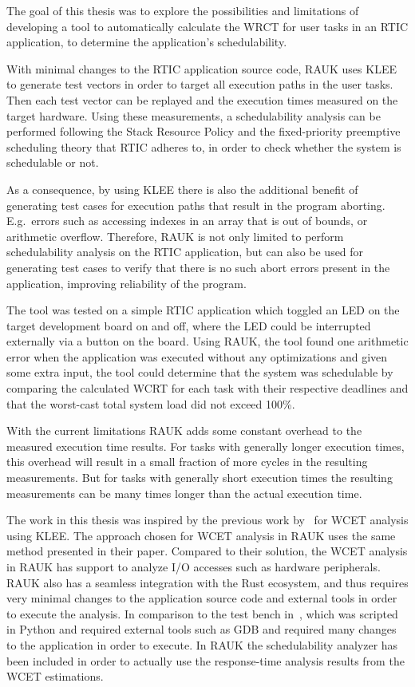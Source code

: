 The goal of this thesis was to explore the possibilities and limitations of
developing a tool to automatically calculate the WRCT for user tasks in an
RTIC application, to determine the application's schedulability.

With minimal changes to the RTIC application source code, RAUK uses KLEE to
generate test vectors in order to target all execution paths in the user tasks.
Then each test vector can be replayed and the execution times measured on the
target hardware. Using these measurements, a schedulability analysis can be
performed following the Stack Resource Policy and the fixed-priority preemptive
scheduling theory that RTIC adheres to, in order to check whether the system is
schedulable or not.

As a consequence, by using KLEE there is also the additional benefit of
generating test cases for execution paths that result in the program aborting.
E.g.\ errors such as accessing indexes in an array that is out of bounds, or
arithmetic overflow. Therefore, RAUK is not only limited to perform
schedulability analysis on the RTIC application, but can also be used for
generating test cases to verify that there is no such abort errors present in
the application, improving reliability of the program.

The tool was tested on a simple RTIC application which toggled an LED on the
target development board on and off, where the LED could be interrupted
externally via a button on the board. Using RAUK, the tool found one arithmetic
error when the application was executed without any optimizations and given
some extra input, the tool could determine that the system was schedulable by
comparing the calculated WCRT for each task with their respective deadlines and
that the worst-cast total system load did not exceed 100\%.

With the current limitations RAUK adds some constant overhead to the measured
execution time results. For tasks with generally longer execution times, this
overhead will result in a small fraction of more cycles in the resulting
measurements. But for tasks with generally short execution times the resulting
measurements can be many times longer than the actual execution time.

The work in this thesis was inspired by the previous work by~\cite{lindner} for
WCET analysis using KLEE\@. The approach chosen for WCET analysis in RAUK uses
the same method presented in their paper. Compared to their solution, the WCET
analysis in RAUK has support to analyze I/O accesses such as hardware
peripherals. RAUK also has a seamless integration with the Rust ecosystem, and
thus requires very minimal changes to the application source code and external
tools in order to execute the analysis. In comparison to the test bench
in~\cite{lindner}, which was scripted in Python and required external tools
such as GDB and required many changes to the application in order to execute.
In RAUK the schedulability analyzer has been included in order to actually use
the response-time analysis results from the WCET estimations.

